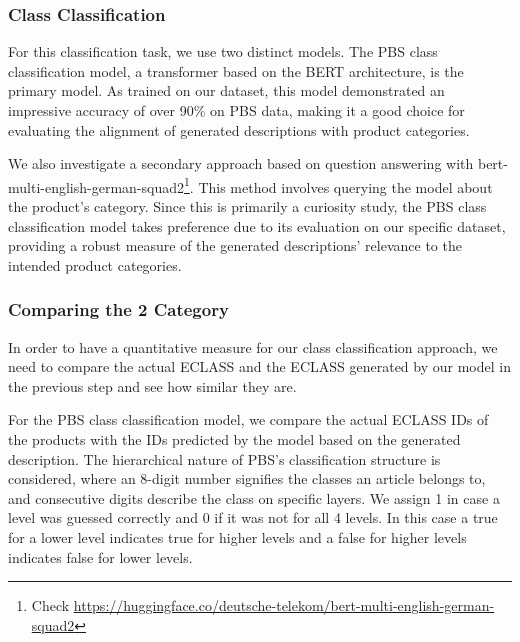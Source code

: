 \subsubsection{Class Classification}

For this classification task, we use two distinct models. The PBS class classification model, a transformer based on the BERT architecture, is the primary model. As trained on our dataset, this model demonstrated an impressive accuracy of over 90\% on PBS data, making it a good choice for evaluating the alignment of generated descriptions with product categories.

We also investigate a secondary approach based on question answering with bert-multi-english-german-squad2\footnote{Check \url{https://huggingface.co/deutsche-telekom/bert-multi-english-german-squad2}}. This method involves querying the model about the product's category. Since this is primarily a curiosity study, the PBS class classification model takes preference due to its evaluation on our specific dataset, providing a robust measure of the generated descriptions' relevance to the intended product categories.

\subsubsection{Comparing the 2 Category}

In order to have a quantitative measure for our class classification approach, we need to compare the actual ECLASS and the ECLASS generated by our model in the previous step and see how similar they are.  

For the PBS class classification model, we compare the actual ECLASS IDs of the products with the IDs predicted by the model based on the generated description. The hierarchical nature of PBS's classification structure is considered, where an 8-digit number signifies the classes an article belongs to, and consecutive digits describe the class on specific layers. We assign 1 in case a level was guessed correctly and 0 if it was not for all 4 levels. In this case a true for a lower level indicates true for higher levels and a false for higher levels indicates false for lower levels.

